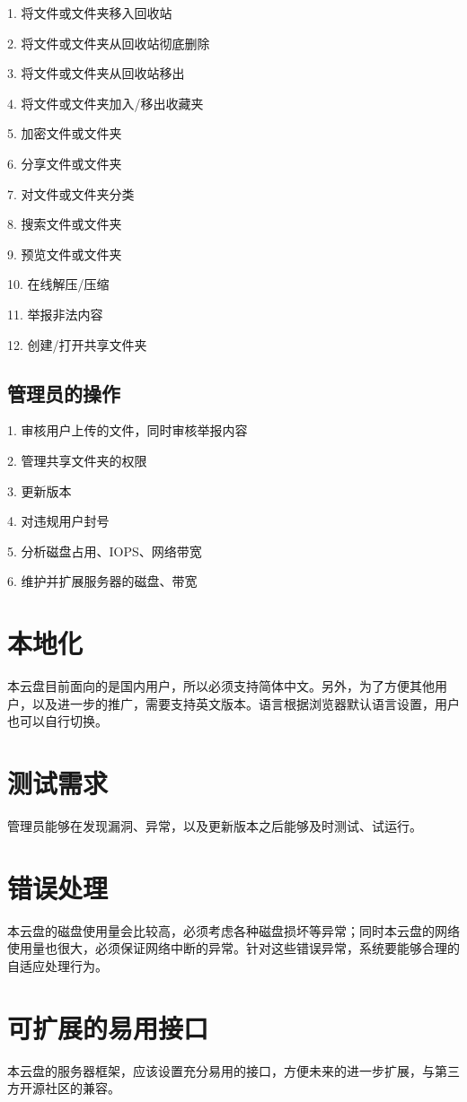     1. 将文件或文件夹移入回收站

    2. 将文件或文件夹从回收站彻底删除

    3. 将文件或文件夹从回收站移出

    4. 将文件或文件夹加入/移出收藏夹

    5. 加密文件或文件夹
    
    6. 分享文件或文件夹

    7. 对文件或文件夹分类

    8. 搜索文件或文件夹

    9. 预览文件或文件夹

    10. 在线解压/压缩

    11. 举报非法内容

    12. 创建/打开共享文件夹

\subsection{管理员的操作}

    1. 审核用户上传的文件，同时审核举报内容

    2. 管理共享文件夹的权限

    3. 更新版本

    4. 对违规用户封号

    5. 分析磁盘占用、IOPS、网络带宽

    6. 维护并扩展服务器的磁盘、带宽

\section{本地化}

本云盘目前面向的是国内用户，所以必须支持简体中文。另外，为了方便其他用户，以及进一步的推广，需要支持英文版本。语言根据浏览器默认语言设置，用户也可以自行切换。

\section{测试需求}
管理员能够在发现漏洞、异常，以及更新版本之后能够及时测试、试运行。

\section{错误处理}
本云盘的磁盘使用量会比较高，必须考虑各种磁盘损坏等异常；同时本云盘的网络使用量也很大，必须保证网络中断的异常。针对这些错误异常，系统要能够合理的自适应处理行为。

\section{可扩展的易用接口}
本云盘的服务器框架，应该设置充分易用的接口，方便未来的进一步扩展，与第三方开源社区的兼容。

